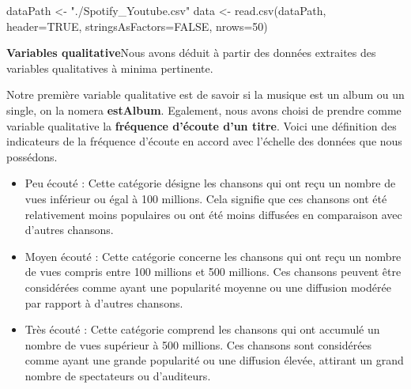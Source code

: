 \documentclass[
]{article}
\newenvironment{Shaded}{\begin{snugshade}}{\end{snugshade}}
\newcommand{\AttributeTok}[1]{\textcolor[rgb]{0.77,0.63,0.00}{#1}}
\newcommand{\ConstantTok}[1]{\textcolor[rgb]{0.00,0.00,0.00}{#1}}
\newcommand{\DecValTok}[1]{\textcolor[rgb]{0.00,0.00,0.81}{#1}}
\newcommand{\FunctionTok}[1]{\textcolor[rgb]{0.00,0.00,0.00}{#1}}
\newcommand{\NormalTok}[1]{#1}
\newcommand{\OtherTok}[1]{\textcolor[rgb]{0.56,0.35,0.01}{#1}}
\newcommand{\StringTok}[1]{\textcolor[rgb]{0.31,0.60,0.02}{#1}}
\begin{document}
\begin{Shaded}
\begin{Highlighting}[]
\NormalTok{  dataPath }\OtherTok{\textless{}{-}} \StringTok{"./Spotify\_Youtube.csv"}
\NormalTok{  data }\OtherTok{\textless{}{-}} \FunctionTok{read.csv}\NormalTok{(dataPath, }\AttributeTok{header=}\ConstantTok{TRUE}\NormalTok{, }\AttributeTok{stringsAsFactors=}\ConstantTok{FALSE}\NormalTok{, }\AttributeTok{nrows=}\DecValTok{50}\NormalTok{)}
\end{Highlighting}
\end{Shaded}

\textbf{Variables qualitative}\newline\newline Nous avons déduit à
partir des données extraites des variables qualitatives à minima
pertinente.

Notre première variable qualitative est de savoir si la musique est un
album ou un single, on la nomera \textbf{estAlbum}. Egalement, nous
avons choisi de prendre comme variable qualitative la \textbf{fréquence
d'écoute d'un titre}. Voici une définition des indicateurs de la
fréquence d'écoute en accord avec l'échelle des données que nous
possédons.

\begin{itemize}
\item
  Peu écouté : Cette catégorie désigne les chansons qui ont reçu un
  nombre de vues inférieur ou égal à 100 millions. Cela signifie que ces
  chansons ont été relativement moins populaires ou ont été moins
  diffusées en comparaison avec d'autres chansons.
\item
  Moyen écouté : Cette catégorie concerne les chansons qui ont reçu un
  nombre de vues compris entre 100 millions et 500 millions. Ces
  chansons peuvent être considérées comme ayant une popularité moyenne
  ou une diffusion modérée par rapport à d'autres chansons.
\item
  Très écouté : Cette catégorie comprend les chansons qui ont accumulé
  un nombre de vues supérieur à 500 millions. Ces chansons sont
  considérées comme ayant une grande popularité ou une diffusion élevée,
  attirant un grand nombre de spectateurs ou d'auditeurs.
\end{itemize}
\end{document}
